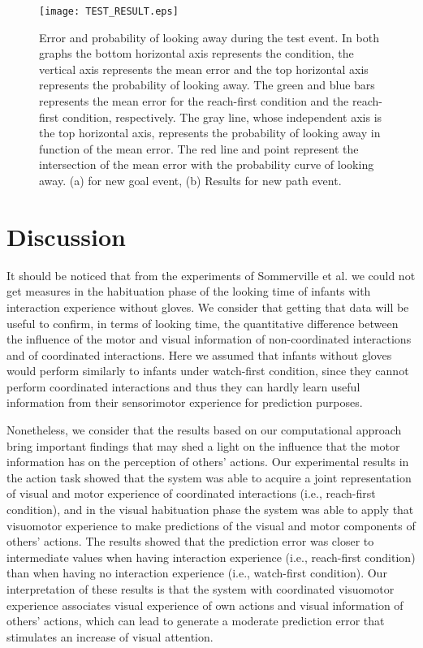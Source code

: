 \documentclass[conference]{IEEEtran}
\begin{document}
\begin{figure}
\centering
\texttt{[image: TEST\_RESULT.eps]}
\caption{Error and probability of looking away during the test event. In both graphs the bottom horizontal axis represents the condition, the vertical axis represents the mean error and the top horizontal axis represents the probability of looking away. The green and blue bars represents the mean error for the reach-first condition and the reach-first condition, respectively. The gray line, whose independent axis is the top horizontal axis, represents the probability of looking away in function of the mean error. The red line and point represent the intersection of the mean error with the probability curve of looking away. (a) for new goal event, (b) Results for new path event.}
\label{figure7}
\end{figure}

\section{Discussion}
It should be noticed that from the experiments of Sommerville et al. \cite{sommerville2005action} we could not get measures in the habituation phase of the looking time of infants with interaction experience without gloves. We consider that getting that data will be useful to confirm, in terms of looking time, the quantitative difference between the influence of the motor and visual information of non-coordinated interactions and of coordinated interactions. Here we assumed that infants without gloves would perform similarly to infants under watch-first condition, since they cannot perform coordinated interactions and thus they can hardly learn useful information from their sensorimotor experience for prediction purposes.

Nonetheless, we consider that the results based on our computational approach bring important findings that may shed a light on the influence that the motor information has on the perception of others' actions. Our experimental results in the action task showed that the system was able to acquire a joint representation of visual and motor experience of coordinated interactions (i.e., reach-first condition), and in the visual habituation phase the system was able to apply that visuomotor experience to make predictions of the visual and motor components of others' actions. The results showed that the prediction error was closer to intermediate values when having interaction experience (i.e., reach-first condition) than when having no interaction experience (i.e., watch-first condition). Our interpretation of these results is that the system with coordinated visuomotor experience associates visual experience of own actions and visual information of others' actions, which can lead to generate a moderate prediction error that stimulates an increase of visual attention.
\end{document}
